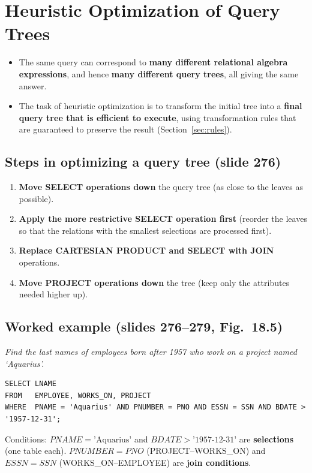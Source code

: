 \documentclass[10pt,a4paper]{article}
\newcommand{\aq}{\text{'Aquarius'}}
\newcommand{\bd}{\text{'1957-12-31'}}
\begin{document}
\section{Heuristic Optimization of Query Trees}

\begin{keybox}
\begin{itemize}
  \item The same query can correspond to \textbf{many different relational algebra expressions}, and hence \textbf{many different query trees}, all giving the same answer.
  \item The task of heuristic optimization is to transform the initial tree into a \textbf{final query tree that is efficient to execute}, using transformation rules that are guaranteed to preserve the result (Section~\ref{sec:rules}).
\end{itemize}
\end{keybox}

\subsection{Steps in optimizing a query tree (slide 276)}
\begin{enumerate}
  \item \textbf{Move SELECT operations down} the query tree (as close to the leaves as possible).
  \item \textbf{Apply the more restrictive SELECT operation first} (reorder the leaves so that the relations with the smallest selections are processed first).
  \item \textbf{Replace CARTESIAN PRODUCT and SELECT with JOIN} operations.
  \item \textbf{Move PROJECT operations down} the tree (keep only the attributes needed higher up).
\end{enumerate}

\subsection{Worked example (slides 276--279, Fig.~18.5)}
\begin{exbox}[Query Q]
\emph{Find the last names of employees born after 1957 who work on a project named `Aquarius'.}
\begin{verbatim}
SELECT LNAME
FROM   EMPLOYEE, WORKS_ON, PROJECT
WHERE  PNAME = 'Aquarius' AND PNUMBER = PNO AND ESSN = SSN AND BDATE > '1957-12-31';
\end{verbatim}
Conditions: $PNAME=\aq$ and $BDATE>\bd$ are \textbf{selections} (one table each). $PNUMBER=PNO$ (PROJECT--WORKS\_ON) and $ESSN=SSN$ (WORKS\_ON--EMPLOYEE) are \textbf{join conditions}.
\end{exbox}
\end{document}
